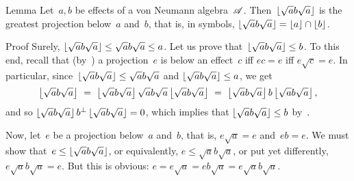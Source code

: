 \documentclass[a]{subfiles}
\begin{document}
%
%
%
\begin{parsec}%
\begin{point}{Lemma}%
Let~$a,b$ be effects of a von Neumann algebra~$\mathscr{A}$.
Then~$\left\lfloor\sqrt{a}b\sqrt{a}\right\rfloor$ is the greatest projection
below~$a$ and~$b$, that is, in symbols, 
$\left\lfloor\sqrt{a}b\sqrt{a}\right\rfloor=\left\lfloor a\right\rfloor\cap \left\lfloor b\right\rfloor$.
\end{point}
\begin{point}{Proof}%
Surely, $\left\lfloor\sqrt{a}b\sqrt{a}\right\rfloor\leq \sqrt{a}b\sqrt{a} \leq a$.
Let us prove that~$\left\lfloor\sqrt{a}b\sqrt{a}\right\rfloor\leq b$.
To this end,
recall
that (by~)
a projection~$e$ is below an effect~$c$
iff $ec=e$ iff $e\sqrt{c}=e$.
In particular,
since~$\left\lfloor\sqrt{a}b\sqrt{a}\right\rfloor\leq \sqrt{a}b\sqrt{a}$ and 
$\left\lfloor\sqrt{a}b\sqrt{a}\right\rfloor\leq a$,
we get
\begin{equation*}
\floor{\sqrt{a}b\sqrt{a}}
\ =\ \floor{\sqrt{a}b\sqrt{a}}\sqrt{a}b\sqrt{a}\floor{\sqrt{a}b\sqrt{a}} \ =\ 
\floor{\sqrt{a}b\sqrt{a}}b\floor{\sqrt{a}b\sqrt{a}},
\end{equation*}
and so $\left\lfloor\sqrt{a}b\sqrt{a}\right\rfloor b^\perp\left\lfloor\sqrt{a}b\sqrt{a}\right\rfloor=0$,
which implies that
$\left\lfloor\sqrt{a}b\sqrt{a}\right\rfloor\leq b$ by~.
\begin{point}%
Now,
let~$e$ be a projection below~$a$ and~$b$,
that is, $e\sqrt{a}=e$ and~$eb=e$.
We must show that~$e\leq \left\lfloor\sqrt{a}b\sqrt{a}\right\rfloor$,
or equivalently, $e\leq \sqrt{a}b\sqrt{a}$,
or put yet differently, $e\sqrt{a}b\sqrt{a}=e$.
But this is obvious: $e=e\sqrt{a}=eb\sqrt{a}=e\sqrt{a}b\sqrt{a}$.
\end{point}
\end{point}
\end{parsec}
\end{document}
